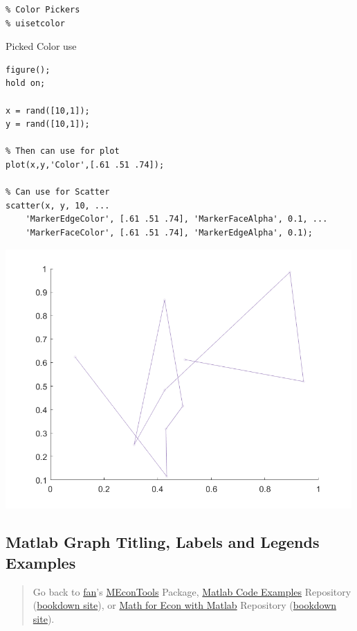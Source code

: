 \documentclass[
]{book}
\begin{document}
\begin{verbatim}
% Color Pickers
% uisetcolor
\end{verbatim}

Picked Color use

\begin{verbatim}
figure();
hold on;

x = rand([10,1]);
y = rand([10,1]);

% Then can use for plot
plot(x,y,'Color',[.61 .51 .74]);

% Can use for Scatter
scatter(x, y, 10, ...
    'MarkerEdgeColor', [.61 .51 .74], 'MarkerFaceAlpha', 0.1, ...
    'MarkerFaceColor', [.61 .51 .74], 'MarkerEdgeAlpha', 0.1);
\end{verbatim}

\includegraphics[width=5.20833in,height=\textheight]{img/fs_color_images/figure_12.png}

\hypertarget{matlab-graph-titling-labels-and-legends-examples}{%
\subsection{Matlab Graph Titling, Labels and Legends Examples}\label{matlab-graph-titling-labels-and-legends-examples}}

\begin{quote}
Go back to \href{http://fanwangecon.github.io/}{fan}'s \href{https://fanwangecon.github.io/MEconTools/}{MEconTools} Package, \href{https://fanwangecon.github.io/M4Econ/}{Matlab Code Examples} Repository (\href{https://fanwangecon.github.io/M4Econ/bookdown}{bookdown site}), or \href{https://fanwangecon.github.io/Math4Econ/}{Math for Econ with Matlab} Repository (\href{https://fanwangecon.github.io/Math4Econ/bookdown}{bookdown site}).
\end{quote}
\end{document}
